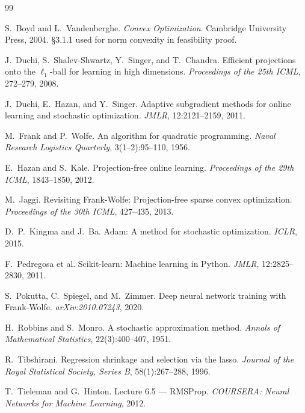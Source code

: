 \documentclass[10pt,twocolumn]{article}
\begin{document}

\begin{thebibliography}{99}

S.\ Boyd and L.\ Vandenberghe.
\textit{Convex Optimization}.
Cambridge University Press, 2004.
\S3.1.1 used for norm convexity in feasibility proof.

J.\ Duchi, S.\ Shalev-Shwartz, Y.\ Singer, and T.\ Chandra.
Efficient projections onto the $\ell_1$-ball for learning in high dimensions.
\textit{Proceedings of the 25th ICML}, 272--279, 2008.

J.\ Duchi, E.\ Hazan, and Y.\ Singer.
Adaptive subgradient methods for online learning and stochastic optimization.
\textit{JMLR}, 12:2121--2159, 2011.

M.\ Frank and P.\ Wolfe.
An algorithm for quadratic programming.
\textit{Naval Research Logistics Quarterly}, 3(1--2):95--110, 1956.

E.\ Hazan and S.\ Kale.
Projection-free online learning.
\textit{Proceedings of the 29th ICML}, 1843--1850, 2012.

M.\ Jaggi.
Revisiting Frank-Wolfe: Projection-free sparse convex optimization.
\textit{Proceedings of the 30th ICML}, 427--435, 2013.

D.\ P.\ Kingma and J.\ Ba.
Adam: A method for stochastic optimization.
\textit{ICLR}, 2015.

F.\ Pedregosa et al.
Scikit-learn: Machine learning in Python.
\textit{JMLR}, 12:2825--2830, 2011.

S.\ Pokutta, C.\ Spiegel, and M.\ Zimmer.
Deep neural network training with Frank-Wolfe.
\textit{arXiv:2010.07243}, 2020.

H.\ Robbins and S.\ Monro.
A stochastic approximation method.
\textit{Annals of Mathematical Statistics}, 22(3):400--407, 1951.

R.\ Tibshirani.
Regression shrinkage and selection via the lasso.
\textit{Journal of the Royal Statistical Society, Series B}, 58(1):267--288, 1996.

T.\ Tieleman and G.\ Hinton.
Lecture 6.5 --- RMSProp.
\textit{COURSERA: Neural Networks for Machine Learning}, 2012.

\end{thebibliography}
\end{document}

